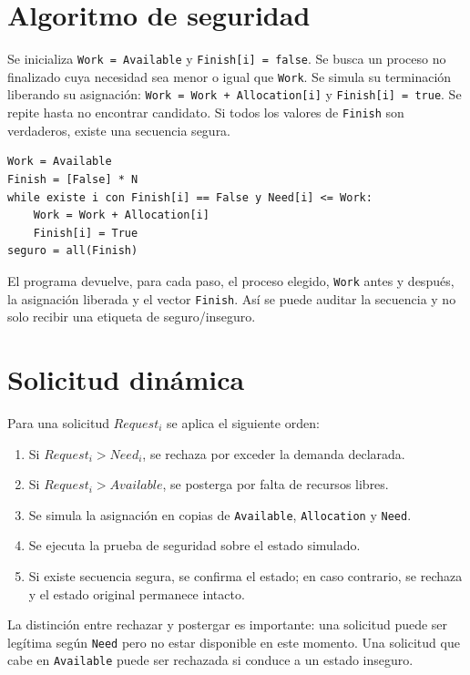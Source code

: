 \documentclass[12pt,a4paper]{article}
\begin{document}
\section{Algoritmo de seguridad}
Se inicializa \texttt{Work = Available} y \texttt{Finish[i] = false}. Se busca un proceso no finalizado cuya necesidad sea menor o igual que \texttt{Work}. Se simula su terminación liberando su asignación: \texttt{Work = Work + Allocation[i]} y \texttt{Finish[i] = true}. Se repite hasta no encontrar candidato. Si todos los valores de \texttt{Finish} son verdaderos, existe una secuencia segura.
\begin{lstlisting}[style=console]
Work = Available
Finish = [False] * N
while existe i con Finish[i] == False y Need[i] <= Work:
    Work = Work + Allocation[i]
    Finish[i] = True
seguro = all(Finish)
\end{lstlisting}
El programa devuelve, para cada paso, el proceso elegido, \texttt{Work} antes y después, la asignación liberada y el vector \texttt{Finish}. Así se puede auditar la secuencia y no solo recibir una etiqueta de seguro/inseguro.
\section{Solicitud dinámica}
Para una solicitud $Request_i$ se aplica el siguiente orden:
\begin{enumerate}
\item Si $Request_i>Need_i$, se rechaza por exceder la demanda declarada.
\item Si $Request_i>Available$, se posterga por falta de recursos libres.
\item Se simula la asignación en copias de \texttt{Available}, \texttt{Allocation} y \texttt{Need}.
\item Se ejecuta la prueba de seguridad sobre el estado simulado.
\item Si existe secuencia segura, se confirma el estado; en caso contrario, se rechaza y el estado original permanece intacto.
\end{enumerate}
La distinción entre rechazar y postergar es importante: una solicitud puede ser legítima según \texttt{Need} pero no estar disponible en este momento. Una solicitud que cabe en \texttt{Available} puede ser rechazada si conduce a un estado inseguro.
\newpage
\end{document}
